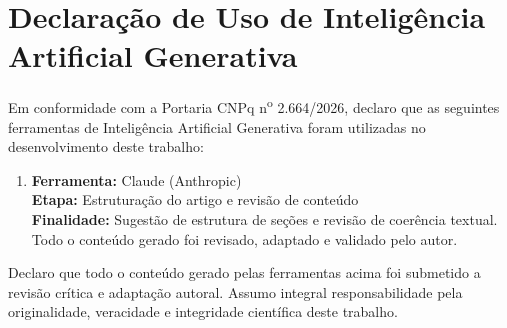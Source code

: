 \documentclass[12pt]{article}
\begin{document}
\section*{Declaração de Uso de Inteligência Artificial Generativa}

Em conformidade com a Portaria CNPq n\textsuperscript{o} 2.664/2026, declaro que as
seguintes ferramentas de Inteligência Artificial Generativa foram utilizadas no
desenvolvimento deste trabalho:

\begin{enumerate}
  \item \textbf{Ferramenta:} Claude (Anthropic) \\
        \textbf{Etapa:} Estruturação do artigo e revisão de conteúdo \\
        \textbf{Finalidade:} Sugestão de estrutura de seções e revisão de coerência
        textual. Todo o conteúdo gerado foi revisado, adaptado e validado pelo autor.
\end{enumerate}

Declaro que todo o conteúdo gerado pelas ferramentas acima foi submetido a revisão
crítica e adaptação autoral. Assumo integral responsabilidade pela originalidade,
veracidade e integridade científica deste trabalho.

% 
% 
\end{document}
